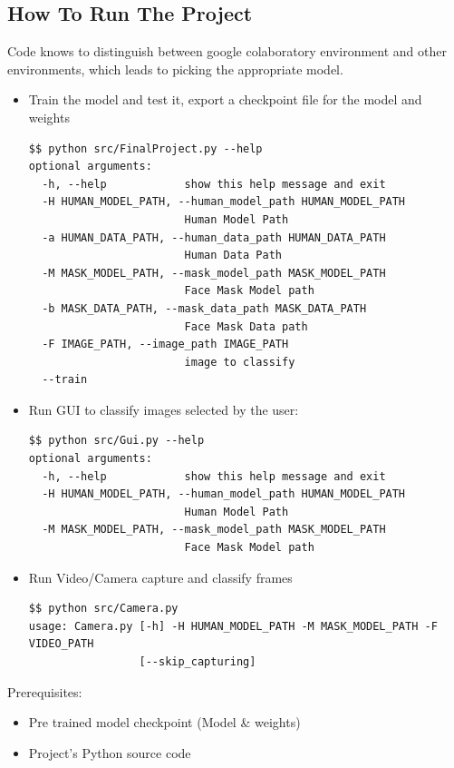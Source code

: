 \subsection{How To Run The Project}
Code knows to distinguish between google colaboratory environment and other environments, which leads to picking the
appropriate model.
\begin{itemize}
\item Train the model and test it, export a checkpoint file for the model and weights
\begin{verbatim}
$$ python src/FinalProject.py --help
optional arguments:
  -h, --help            show this help message and exit
  -H HUMAN_MODEL_PATH, --human_model_path HUMAN_MODEL_PATH
                        Human Model Path
  -a HUMAN_DATA_PATH, --human_data_path HUMAN_DATA_PATH
                        Human Data Path
  -M MASK_MODEL_PATH, --mask_model_path MASK_MODEL_PATH
                        Face Mask Model path
  -b MASK_DATA_PATH, --mask_data_path MASK_DATA_PATH
                        Face Mask Data path
  -F IMAGE_PATH, --image_path IMAGE_PATH
                        image to classify
  --train
\end{verbatim}

\item{Run GUI to classify images selected by the user:}
\begin{verbatim}
$$ python src/Gui.py --help
optional arguments:
  -h, --help            show this help message and exit
  -H HUMAN_MODEL_PATH, --human_model_path HUMAN_MODEL_PATH
                        Human Model Path
  -M MASK_MODEL_PATH, --mask_model_path MASK_MODEL_PATH
                        Face Mask Model path
\end{verbatim}
    \item{Run Video/Camera capture and classify frames}
    \begin{verbatim}
$$ python src/Camera.py
usage: Camera.py [-h] -H HUMAN_MODEL_PATH -M MASK_MODEL_PATH -F VIDEO_PATH
                 [--skip_capturing]

    \end{verbatim}
\end{itemize}

Prerequisites:
\begin{itemize}
    \item Pre trained model checkpoint (Model \& weights)
    \item Project's Python source code
\end{itemize}

